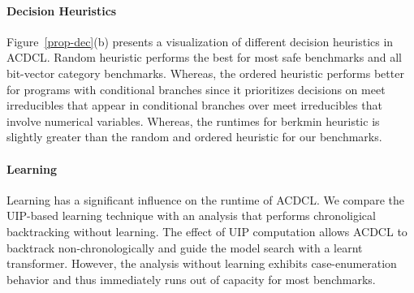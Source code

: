 \paragraph {\textbf{Decision Heuristics}} Figure~\ref{prop-dec}(b) presents a 
visualization of different decision heuristics in ACDCL.  Random heuristic
performs the best for most safe benchmarks and all bit-vector category 
benchmarks.  Whereas, the ordered heuristic performs better for programs 
with conditional branches since it prioritizes decisions on meet 
irreducibles that appear in conditional branches over meet irreducibles 
that involve numerical variables.  Whereas, the runtimes for berkmin 
heuristic is slightly greater than the random and ordered heuristic 
for our benchmarks. 

\paragraph {\textbf{Learning}} Learning has a significant influence on
the runtime of ACDCL.  We compare the UIP-based learning technique with 
an analysis that performs chronoligical backtracking without learning. 
The effect of UIP computation allows ACDCL to backtrack non-chronologically 
and guide the model search with a learnt transformer.  However, the analysis 
without learning exhibits case-enumeration behavior and thus immediately 
runs out of capacity for most benchmarks. 


